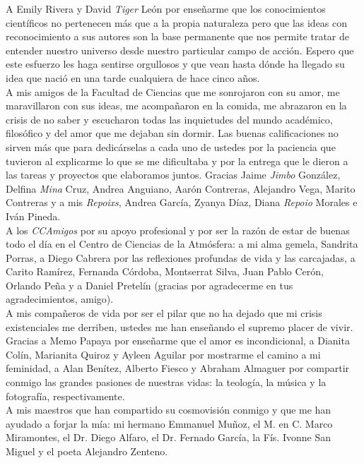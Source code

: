 A Emily Rivera y David \textit{Tiger} León por enseñarme que los conocimientos científicos no pertenecen más que a la propia naturaleza pero que las ideas con reconocimiento a sus autores son la base permanente que nos permite tratar de entender nuestro universo desde nuestro particular campo de acción. Espero que este esfuerzo les haga sentirse orgullosos y que vean hasta dónde ha llegado su idea que nació en una tarde cualquiera de hace cinco años.\\

A mis amigos de la Facultad de Ciencias que me sonrojaron con su amor, me maravillaron con sus ideas, me acompañaron en la comida, me abrazaron en la crisis de no saber y escucharon todas las inquietudes del mundo académico, filosófico y del amor que me dejaban sin dormir. Las buenas calificaciones no sirven más que para dedicárselas a cada uno de ustedes por la paciencia que tuvieron al explicarme lo que se me dificultaba y por la entrega que le dieron a las tareas y proyectos que elaboramos juntos. Gracias Jaime \textit{Jimbo} González, Delfina \textit{Mina} Cruz, Andrea Anguiano, Aarón Contreras, Alejandro Vega, Marito Contreras y a mis \textit{Repoixs}, Andrea García, Zyanya Díaz, Diana \textit{Repoio} Morales e Iván Pineda.\\

A los \textit{CCAmigos} por su apoyo profesional y por ser la razón de estar de buenas todo el día en el Centro de Ciencias de la Atmósfera: a mi alma gemela, Sandrita Porras, a Diego Cabrera por las reflexiones profundas de vida y las carcajadas, a Carito Ramírez, Fernanda Córdoba, Montserrat Silva, Juan Pablo Cerón, Orlando Peña y a Daniel Pretelín (gracias por agradecerme en tus agradecimientos, amigo).\\

A mis compañeros de vida por ser el pilar que no ha dejado que mi crisis existenciales me derriben, ustedes me han enseñando el supremo placer de vivir. Gracias a Memo Papaya por enseñarme que el amor es incondicional, a Dianita Colín, Marianita Quiroz y Ayleen Aguilar por mostrarme el camino a mi feminidad, a Alan Benítez, Alberto Fiesco y Abraham Almaguer por compartir conmigo las grandes pasiones de nuestras vidas: la teología, la música y la fotografía, respectivamente.\\

A mis maestros que han compartido su cosmovisión conmigo y que me han ayudado a forjar la mía: mi hermano Emmanuel Muñoz, el M. en C. Marco Miramontes, el Dr. Diego Alfaro, el Dr. Fernado García, la Fís. Ivonne San Miguel y el poeta Alejandro Zenteno.\\

